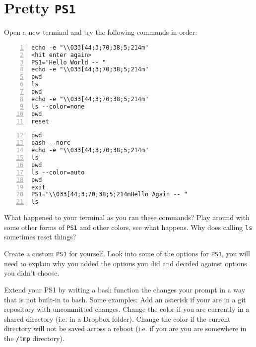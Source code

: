 \documentclass{article}
\begin{document}


\section{Pretty \texttt{PS1}}

Open a new terminal and try the following commands in order:

\begin{minipage}[t]{0.5\textwidth}
\begin{lstlisting}[numbers=left]
echo -e "\\033[44;3;70;38;5;214m"
<hit enter again>
PS1="Hello World -- "
echo -e "\\033[44;3;70;38;5;214m"
pwd
ls
pwd
echo -e "\\033[44;3;70;38;5;214m"
ls --color=none
pwd
reset
\end{lstlisting}
\end{minipage}
\begin{minipage}[t]{0.5\textwidth}
  \begin{lstlisting}[numbers=left,firstnumber=12]
pwd
bash --norc
echo -e "\\033[44;3;70;38;5;214m"
ls
pwd
ls --color=auto
pwd
exit
PS1="\\033[44;3;70;38;5;214mHello Again -- "
ls
\end{lstlisting}
\end{minipage}

\noindent
What happened to your terminal as you ran these commands?
Play around with some other forms of \texttt{PS1} and other colors, see what
happens. Why does calling \texttt{ls} sometimes reset things?

\medskip
\noindent
Create a custom \texttt{PS1} for yourself. Look into some of the options for
\texttt{PS1}, you will need to explain why you added the options you did and
decided against options you didn't choose.

\medskip
\noindent
Extend your PS1 by writing a bash function the changes your prompt in a way
that is not built-in to bash. Some examples: Add an asterisk if your are in a
git repository with uncommitted changes. Change the color if you are currently
in a shared directory (i.e. in a Dropbox folder). Change the color if the
current directory will not be saved across a reboot (i.e. if you are you are
somewhere in the \texttt{/tmp} directory).
\end{document}

